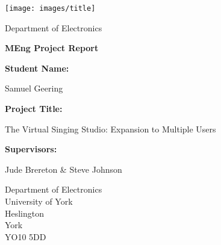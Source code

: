\begin{titlepage}
	\begin{center}
		
		\texttt{[image: images/title]}
		
		\vspace{1cm}
		\huge
		Department of Electronics
		
		
		\vspace{0.5cm}
		\huge
		\textbf{MEng Project Report}
	\end{center}
		
	\vspace{2cm}
		
		
	\large
	\noindent\textbf{Student Name:} \begin{center}Samuel Geering \end{center}
	
	\vspace{0cm}
	\noindent\textbf{Project Title:} \begin{center}The Virtual Singing Studio: Expansion to Multiple Users\end{center}
	
	\vspace{0cm}
	\noindent\textbf{Supervisors:} \begin{center}Jude Brereton \& Steve Johnson\end{center}

	\vspace{2.5cm}
		
	\begin{center}
		\small
		Department of Electronics\\University of York\\Heslington\\York\\YO10 5DD
	\end{center}
		
	
\end{titlepage}